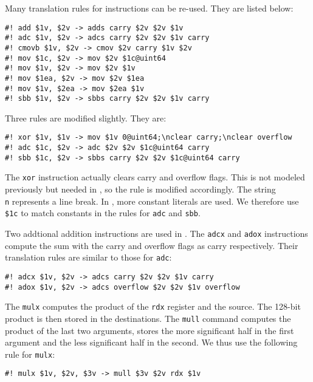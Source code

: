 \documentclass{amsproc}
\begin{document}
Many translation rules for \xeightysix instructions can be
re-used. They are listed below:
\begin{verbatim}
#! add $1v, $2v -> adds carry $2v $2v $1v
#! adc $1v, $2v -> adcs carry $2v $2v $1v carry
#! cmovb $1v, $2v -> cmov $2v carry $1v $2v
#! mov $1c, $2v -> mov $2v $1c@uint64
#! mov $1v, $2v -> mov $2v $1v
#! mov $1ea, $2v -> mov $2v $1ea
#! mov $1v, $2ea -> mov $2ea $1v
#! sbb $1v, $2v -> sbbs carry $2v $2v $1v carry
\end{verbatim}

Three rules are modified slightly. They are:
\begin{verbatim}
#! xor $1v, $1v -> mov $1v 0@uint64;\nclear carry;\nclear overflow
#! adc $1c, $2v -> adc $2v $2v $1c@uint64 carry
#! sbb $1c, $2v -> sbbs carry $2v $2v $1c@uint64 carry
\end{verbatim}
The \xeightysix \texttt{xor} instruction actually clears carry and
overflow flags. This is not modeled previously but needed in
\nistzmul, so the rule is modified accordingly. The string
\texttt{\\n} represents a line break. In \nistzmul, more
constant literals are used. We therefore use \texttt{\$1c} to match
constants in the rules for \texttt{adc} and \texttt{sbb}.

Two addtional addition instructions are used in \nistzmul. The
\texttt{adcx} and \texttt{adox} instructions compute the sum with the
carry and overflow flags as carry respectively. Their translation
rules are similar to those for \texttt{adc}:
\begin{verbatim}
#! adcx $1v, $2v -> adcs carry $2v $2v $1v carry
#! adox $1v, $2v -> adcs overflow $2v $2v $1v overflow
\end{verbatim}

The \xeightysix \texttt{mulx} computes the product of the \texttt{rdx}
register and the source. The 128-bit product is then stored in the
destinations. The \cryptoline \texttt{mull} command computes the
product of the last two arguments, stores the more significant half
in the first argument and the less significant half in the second. We
thus use the following rule for \texttt{mulx}:
\begin{verbatim}
#! mulx $1v, $2v, $3v -> mull $3v $2v rdx $1v
\end{verbatim}
\end{document}
